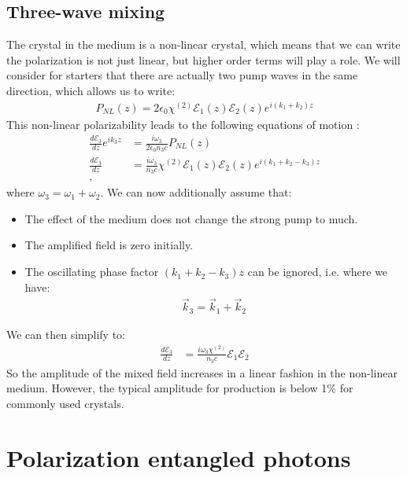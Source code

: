 \documentclass[10pt]{article}
\let\cite\citep
\providecommand\citep{\cite}
\begin{document}
\subsection{Three-wave mixing}
The crystal in the medium is a non-linear crystal, which means that we can write the polarization is not just linear, but higher order terms will play a role. We will consider for starters that there are actually two pump waves in the same direction, which allows us to write:
\begin{align}
P_{NL}(z) = 2\epsilon_0 \chi^{(2)}\mathcal{E}_1(z)\mathcal{E}_2(z)e^{i(k_1+k_2)z}
\end{align}
This non-linear polarizability leads to the following equations of motion  \cite{grynberg}:
\begin{align}
\frac{d\mathcal{E}_3}{dz}e^{ik_3 z} &= \frac{i\omega_3}{2\epsilon_0n_3c}P_{NL}(z) \\
 \frac{d\mathcal{E}_3}{dz}&= \frac{i\omega_3}{n_3c}\chi^{(2)}\mathcal{E}_1(z)\mathcal{E}_2(z)e^{i(k_1+k_2-k_3)z} \\,
\end{align}
where $\omega_3 = \omega_1 + \omega_2$. We can now additionally assume that:
\begin{itemize} 
\item The effect of the medium does not change the strong pump to much.
\item The amplified field is zero initially.
\item The oscillating phase factor $(k_1+k_2-k_3)z$ can be ignored, i.e. where we have:
\begin{align}
\vec{k}_3 = \vec{k}_1 + \vec{k}_2
\end{align}
\end{itemize}
We can then simplify to:
\begin{align}
 \frac{d\mathcal{E}_3}{dz}&=\frac{i\omega_3 \chi^{(2)}}{n_3c}\mathcal{E}_1\mathcal{E}_2
\end{align}
So the amplitude of the mixed field increases in a linear fashion in the non-linear medium. However, the typical amplitude for production is below 1\% for commonly used crystals.  

\section{Polarization entangled photons}
\end{document}
